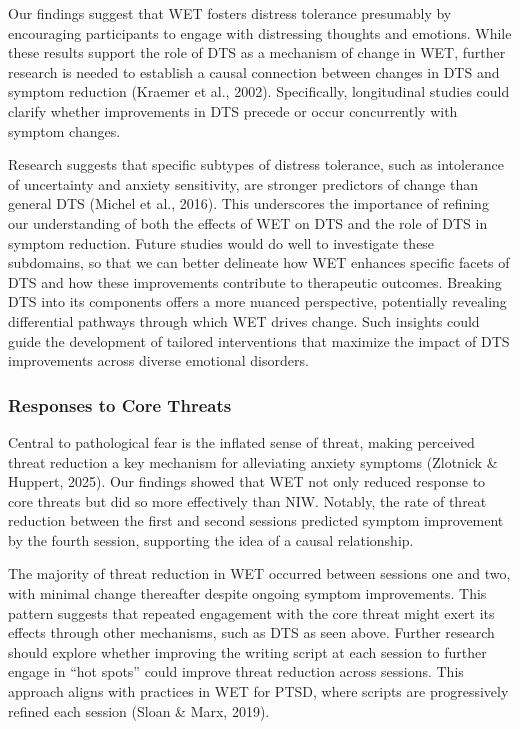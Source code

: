 \documentclass[
  man,floatsintext]{apa7}
\begin{document}
Our findings suggest that WET fosters distress tolerance presumably by encouraging participants to engage with distressing thoughts and emotions.
While these results support the role of DTS as a mechanism of change in WET, further research is needed to establish a causal connection between changes in DTS and symptom reduction (Kraemer et al., 2002).
Specifically, longitudinal studies could clarify whether improvements in DTS precede or occur concurrently with symptom changes.

Research suggests that specific subtypes of distress tolerance, such as intolerance of uncertainty and anxiety sensitivity, are stronger predictors of change than general DTS (Michel et al., 2016).
This underscores the importance of refining our understanding of both the effects of WET on DTS and the role of DTS in symptom reduction.
Future studies would do well to investigate these subdomains, so that we can better delineate how WET enhances specific facets of DTS and how these improvements contribute to therapeutic outcomes.
Breaking DTS into its components offers a more nuanced perspective, potentially revealing differential pathways through which WET drives change.
Such insights could guide the development of tailored interventions that maximize the impact of DTS improvements across diverse emotional disorders.

\subsubsection{Responses to Core Threats}\label{responses-to-core-threats}

Central to pathological fear is the inflated sense of threat, making perceived threat reduction a key mechanism for alleviating anxiety symptoms (Zlotnick \& Huppert, 2025).
Our findings showed that WET not only reduced response to core threats but did so more effectively than NIW.
Notably, the rate of threat reduction between the first and second sessions predicted symptom improvement by the fourth session, supporting the idea of a causal relationship.

The majority of threat reduction in WET occurred between sessions one and two, with minimal change thereafter despite ongoing symptom improvements.
This pattern suggests that repeated engagement with the core threat might exert its effects through other mechanisms, such as DTS as seen above.
Further research should explore whether improving the writing script at each session to further engage in ``hot spots'' could improve threat reduction across sessions.
This approach aligns with practices in WET for PTSD, where scripts are progressively refined each session (Sloan \& Marx, 2019).
\end{document}
